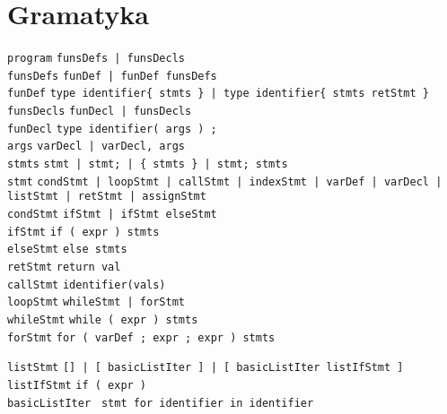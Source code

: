 \documentclass{article}
\newcommand{\keyword}[1]{\colorbox{light-gray}{\texttt{#1}}}
\newcommand{\code}[1]{\texttt{#1}}
\begin{document}
\section{Gramatyka}
\code{program} \textrightarrow \code{funsDefs | funsDecls} \\
\code{funsDefs} \textrightarrow \code{funDef | funDef funsDefs} \\
\code{funDef} \textrightarrow \code{type identifier\{ stmts \} | type identifier\{ stmts retStmt \}} \\
\code{funsDecls} \textrightarrow \code{funDecl | funsDecls} \\
\code{funDecl} \textrightarrow \code{type identifier( args ) \keyword{;}} \\
\code{args} \textrightarrow \code{varDecl | varDecl, args} \\
\code{stmts} \textrightarrow \code{stmt | stmt\keyword{;} | \keyword{\{} stmts \keyword{\}} | stmt\keyword{;} stmts} \\
\code{stmt} \textrightarrow \code{condStmt | loopStmt | callStmt | indexStmt | varDef | varDecl | listStmt | retStmt | assignStmt} \\

\code{condStmt} \textrightarrow \code{ifStmt | ifStmt elseStmt} \\
\code{ifStmt} \textrightarrow \code{\keyword{if (} expr \keyword{)} stmts } \\
\code{elseStmt} \textrightarrow \code{\keyword{else} stmts} \\
\code{retStmt} \textrightarrow \code{\keyword{return} val} \\
\code{callStmt} \textrightarrow \code{identifier\keyword{(}vals\keyword{)}} \\

\code{loopStmt} \textrightarrow \code{whileStmt | forStmt} \\
\code{whileStmt} \textrightarrow \code{\keyword{while (} expr \keyword{)} stmts} \\
\code{forStmt} \textrightarrow \code{\keyword{for (} varDef \keyword{;} expr \keyword{;} expr \keyword{)} stmts}

\code{listStmt} \textrightarrow \code{\keyword{[]} | \keyword{[} basicListIter \keyword{]} | \keyword{[} basicListIter listIfStmt \keyword{]} } \\
\code{listIfStmt} \textrightarrow \code{\keyword{if (} expr \keyword{)}} \\
\code{basicListIter} \textrightarrow \code{ stmt \keyword{for} identifier \keyword{in} identifier} \\
\end{document}
